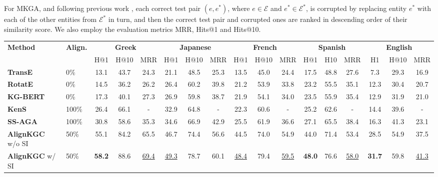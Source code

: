 \documentclass[11pt]{article}
\begin{document}
For MKGA, and following previous work \cite{MTransE,wu2019relation,sun2020knowledge,singh2021multilingual}, each correct test pair $(e, e^*)$, where $e \in \mathcal{E}$ and $e^* \in \mathcal{E}^*$, is corrupted by replacing entity $e^*$ with each of the other entities from $\mathcal{E}^*$ in turn, and then the correct test pair and corrupted ones are ranked in descending order of
their similarity score. We also employ the evaluation metrics MRR, Hits@1 and Hits@10. 





\begin{table*}[!t]
    \begin{adjustbox}{width=440pt,center}
    \centering
    \setlength{\tabcolsep}{0.2em}
    \def\arraystretch{1.1}
    \begin{tabular}{l|l|ccc|ccc|ccc|ccc|ccc}
\hline
    \multirow{2}{*}{\bf Method} & 
    \multirow{2}{*}{\bf Align.} &
    \multicolumn{3}{c|}{\bf Greek} &
    \multicolumn{3}{c|}{\bf Japanese} &
    \multicolumn{3}{c|}{\bf French} &
    \multicolumn{3}{c|}{\bf Spanish} &
    \multicolumn{3}{c}{\bf English} \\
    \cline{3-17} 
    & & H@1 & H@10 & MRR & H@1 & H@10 & MRR & H@1 & H@10 & MRR & H@1 & H10 & MRR & H1 & H@10 & MRR \\
    \hline
    \bf TransE & 0\% & 13.1 & 43.7 & 24.3 & 21.1 & 48.5 & 25.3 & 13.5 & 45.0 & 24.4 & 17.5 & 48.8 & 27.6 & 7.3 & 29.3 & 16.9 \\
    \bf RotatE & 0\% & 14.5 & 36.2 & 26.2 & 26.4 & 60.2 & 39.8 & 21.2 & 53.9 & 33.8 & 23.2 & 55.5 & 35.1 & 12.3 & 30.4 & 20.7 \\
    \bf KG-BERT & 0\% & 17.3 & 40.1 & 27.3 & 26.9 & 59.8 & 38.7 & 21.9 & 54.1 & 34.0 & 23.5 & 55.9 & 35.4 & 12.9 & 31.9 & 21.0\\
    \hline
    \bf KenS & 100\% & 26.4 & 66.1 & - & 32.9 & 64.8 & - & 22.3 & 60.6 & - & 25.2 & 62.6 & - & 14.4 & 39.6 & - \\
    \bf SS-AGA & 100\% & 30.8 & 58.6 & 35.3 & 34.6 & 66.9 & 42.9 & 25.5 & 61.9 & 36.6 & 27.1 & 65.5 & 38.4 & 16.3 & 41.3 & 23.1 \\
    
    \textbf{AlignKGC} w/o SI & 50\% & 55.1 & 84.2 & 65.5 & 46.7 & 74.4 & 56.6 & 44.5 & 74.0 & 54.9 & 44.0 & 71.4 & 53.4 & 28.5 & 54.9 & 37.5 \\
    
    \textbf{AlignKGC} w/ SI & 50\% & \bf 58.2 & 88.6 & \underline{69.4} & \underline{49.3} & 78.7 & 60.1 & \underline{48.4} & 79.4 & \underline{59.5} & \bf 48.0 & 76.6 & \underline{58.0} & \bf 31.7 & 59.8 & \underline{41.3} \\
    

\end{tabular}
\end{adjustbox}
\end{table*}
\end{document}
